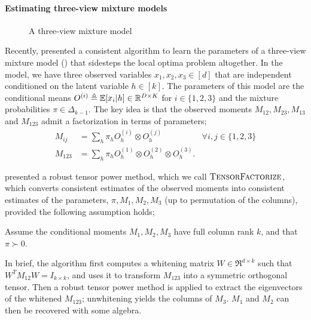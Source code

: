 \paragraph{Estimating three-view mixture models}

\begin{figure}[t]
  \label{fig:three-view}
  \centering
  
  \caption{A three-view mixture model}
\end{figure}

Recently, \citet{anandkumar12moments} presented a consistent algorithm
  to learn the parameters of a three-view mixture model
  () that sidesteps the local optima problem
  altogether. 
In the model, we have three observed variables $x_1, x_2, x_3 \in [d]$
  that are independent conditioned on the latent variable $h \in [k]$. 
  The parameters of this model are the conditional means $O^{(i)} \triangleq
  \mathbb{E}[x_i | h] \in \mathbb{R}^{D \times K}$ for $i \in \{1,2,3\}$ and the mixture probabilities $\pi
  \in \Delta_{k-1}$.
  The key idea is that the observed moments $M_{12}, M_{23}, M_{13}$ and
  $M_{123}$ admit a factorization in terms of parameters;
\begin{align*}
  M_{ij} &= \sum_h \pi_h O^{(i)}_h \otimes O^{(j)}_h & \forall i,j \in \{1,2,3\} \\
  M_{123} &= \sum_h \pi_h O^{(1)}_h \otimes O^{(2)}_h \otimes O^{(3)}_h.
\end{align*}

\citet{anandkumar13tensor} presented a robust tensor power method, which
  we call $\textsc{TensorFactorize}$, which converts consistent estimates of the observed moments 
  into consistent estimates of the parameters,
  $\pi, M_1, M_2, M_3$ (up to permutation of the columns), provided
  the following assumption holds;

\begin{assumption}
Assume the conditional moments $M_1, M_2, M_3$ have full column rank
  $k$, and that $\pi \succ 0$.
\end{assumption}

In brief, the algorithm first computes a whitening matrix $W \in
  \Re^{d \times k}$ such that $W^T M_{12} W = I_{k \times k}$,
  and uses it to transform $M_{123}$ into a symmetric orthogonal tensor.  
Then a robust tensor power method is applied to extract the eigenvectors
  of the whitened $M_{123}$; unwhitening yields the columns of $M_{3}$.
$M_1$ and $M_2$ can then be recovered with some algebra.


